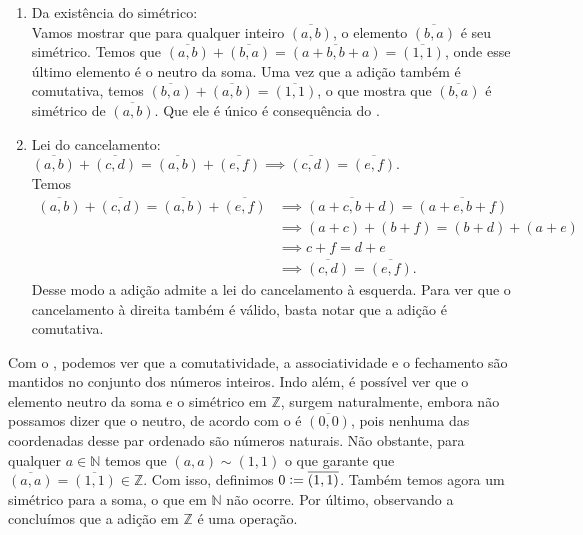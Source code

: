 \documentclass[../main.tex]{subfiles}
\begin{document}
\begin{dem}
\begin{enumerate}[label=(\roman*)]
        \item Da existência do simétrico: \\
        Vamos mostrar que para qualquer inteiro $\overline{(a,b)}$, o elemento $\overline{(b,a)}$ é seu simétrico. 
        Temos que $\overline{(a,b)}+ \overline{(b,a)} = \overline{(a+b,b+a)} = \overline{(1,1)}$, onde esse último elemento é o neutro da soma. Uma vez que a adição também é comutativa, temos $ \overline{(b,a)} + \overline{(a,b)} = \overline{(1,1)}$, o que mostra que $\overline{(b,a)}$ é simétrico de $\overline{(a,b)}$. Que ele é único é consequência do .
       
        \item Lei do cancelamento: $\overline{(a,b)} + \overline{(c,d)} = \overline{(a,b)} + \overline{(e,f)} \implies \overline{(c,d)} = \overline{(e,f)}$. \\
        Temos 
        \begin{align*}
            \overline{(a,b)} + \overline{(c,d)} = \overline{(a,b)} + \overline{(e,f)} 
            &\implies \overline{(a+c,b+d)} = \overline{(a+e,b+f)} \\ 
            &\implies (a+c)+(b+f)=(b+d)+(a+e) \\
            &\implies c+f = d+e \\ 
            &\implies \overline{(c,d)} = \overline{(e,f)}.
        \end{align*}
        Desse modo a adição admite a lei do cancelamento à esquerda. Para ver que o cancelamento à direita também é válido, basta notar que a adição é comutativa.
    \end{enumerate}
\end{dem}



Com o , podemos ver que a comutatividade, a associatividade e o fechamento são mantidos no conjunto dos números inteiros. Indo além, é possível ver que o elemento neutro da soma e o simétrico em $\mathbb{Z}$, surgem naturalmente, embora não possamos dizer que o neutro, de acordo com o  é $\overline{(0,0)}$, pois nenhuma das coordenadas desse par ordenado são números naturais. Não obstante, para qualquer $a \in \mathbb{N}$ temos que $(a,a) \sim (1,1)$ o que garante que $\overline{(a,a)} =\overline{(1,1)} \in \mathbb{Z}$. Com isso, definimos $0 \vcentcolon= \overline{(1,1)}$. Também temos agora um simétrico para a soma, o que em $\mathbb{N}$ não ocorre. Por último, observando a  concluímos que a adição em $\mathbb{Z}$ é uma operação.
\end{document}
